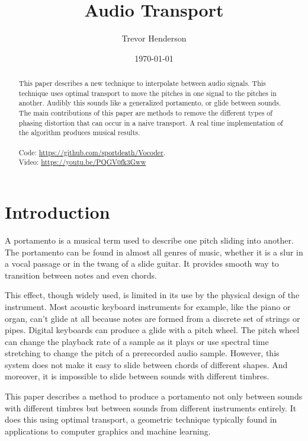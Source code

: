 \documentclass[12pt]{article}
\title{Audio Transport}
\date{\today}
\author{Trevor Henderson}
\begin{document}
\maketitle

\begin{abstract}
  This paper describes a new technique to interpolate between audio signals.
  This technique uses optimal transport to move the pitches in one signal to the pitches in another.
  Audibly this sounds like a generalized portamento, or glide between sounds.
  The main contributions of this paper are methods to remove the different types of phasing distortion that can occur in a naive transport.
  A real time implementation of the algorithm produces musical results.
  \\
  \\
  Code: \href{https://github.com/sportdeath/Vocoder}{https://github.com/sportdeath/Vocoder}.
  \\
  Video: \href{https://youtu.be/PQGV0fk3Gww}{https://youtu.be/PQGV0fk3Gww}
\end{abstract}

\section{Introduction}

A portamento is a musical term used to describe one pitch sliding into another.
The portamento can be found in almost all genres of music, 
whether it is a slur in a vocal passage or in the twang of a slide guitar.
It provides smooth way to transition between notes and even chords.

This effect, though widely used, is limited in its use by the physical design of the instrument. 
Most acoustic keyboard instruments for example, like the piano or organ, can't glide at all because notes are formed from a discrete set of strings or pipes. 
Digital keyboards can produce a glide with  a pitch wheel.
The pitch wheel can change the playback rate of a sample as it plays or use spectral time stretching to change the pitch of a prerecorded audio sample.
However, this system does not make it easy to slide between chords of different shapes.
And moreover, it is impossible to slide between sounds with different timbres.

This paper describes a method to produce a portamento not only between sounds with different timbres but between sounds from different instruments entirely.
It does this using optimal transport, a geometric technique typically found in applications to computer graphics and machine learning.
\end{document}
